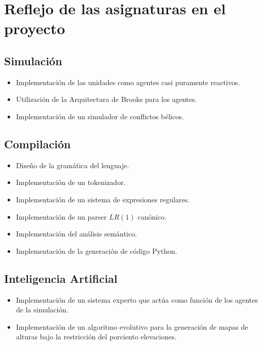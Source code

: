 \section{Reflejo de las asignaturas en el proyecto}

\subsection{Simulación}

\begin{itemize}
    \item Implementación de las unidades como agentes casi puramente reactivos.
    \item Utilización de la Arquitectura de Brooks para los agentes.
    \item Implementaci\'on de un simulador de conflictos b\'elicos.
\end{itemize}

\subsection{Compilación}

\begin{itemize}
    \item Diseño de la gramática del lenguaje.
    \item Implementación de un tokenizador.
    \item Implementación de un sistema de expresiones regulares.
    \item Implementación de un parser $LR(1)$ canónico.
    \item Implementación del análisis semántico.
    \item Implementación de la generación de código Python.
\end{itemize}

\subsection{Inteligencia Artificial}

\begin{itemize}
    \item Implementación de un sistema experto que actúa como función de los agentes de la simulación.
    \item Implementación de un algoritmo evolutivo para la generación de mapas de alturas bajo la restricción del porciento elevaciones.
\end{itemize}